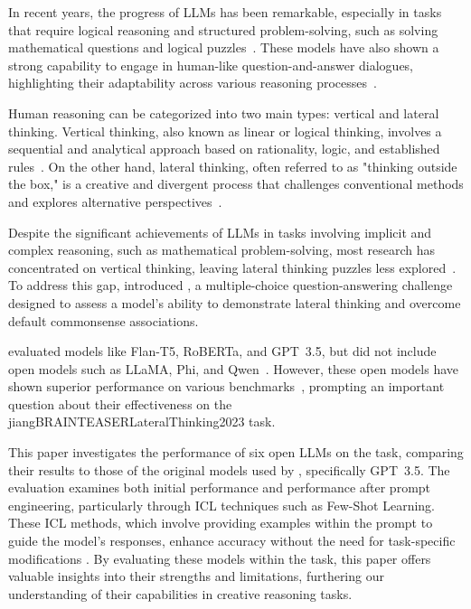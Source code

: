 In recent years, the progress of \acp{LLM} has been remarkable, especially in tasks that require logical reasoning and structured problem-solving, such as solving mathematical questions and logical puzzles~\cite{panLogicLMEmpoweringLarge2023,zebazeTreeProblemsImproving2024,yuFlowReasoningTraining2025}. These models have also shown a strong capability to engage in human-like question-and-answer dialogues, highlighting their adaptability across various reasoning processes~\cite{haoRecentProgressLeveraging2022, panLogicLMEmpoweringLarge2023,zebazeTreeProblemsImproving2024,yuFlowReasoningTraining2025}.

Human reasoning can be categorized into two main types: vertical and lateral thinking. Vertical thinking, also known as linear or logical thinking, involves a sequential and analytical approach based on rationality, logic, and established rules~\cite{jiangBRAINTEASERLateralThinking2023}. On the other hand, lateral thinking, often referred to as "thinking outside the box," is a creative and divergent process that challenges conventional methods and explores alternative perspectives~\cite{jiangBRAINTEASERLateralThinking2023}.

Despite the significant achievements of \acp{LLM} in tasks involving implicit and complex reasoning, such as mathematical problem-solving, most research has concentrated on vertical thinking, leaving lateral thinking puzzles less explored~\cite{jiangBRAINTEASERLateralThinking2023,chenWeakevalStrongEvaluatingEliciting2024,huangLatEvalInteractiveLLMs2024}. To address this gap, \textcite{jiangBRAINTEASERLateralThinking2023} introduced , a multiple-choice question-answering challenge designed to assess a model's ability to demonstrate lateral thinking and overcome default commonsense associations.

\textcite{jiangBRAINTEASERLateralThinking2023} evaluated models like Flan-T5, RoBERTa, and \acs{GPT}~3.5, but did not include open models such as \acs{LLaMA}, \acs{Phi}, and \acs{Qwen}~\cite{jiangBRAINTEASERLateralThinking2023}. However, these open 
models have shown superior performance on various benchmarks~\cite{OpenLLMLeaderboard}, 
prompting an important question about their effectiveness on the \citetitle
{jiangBRAINTEASERLateralThinking2023} task.

This paper investigates the performance of six open \acp{LLM} on the  task, comparing their results to those of the original models used by \textcite{jiangBRAINTEASERLateralThinking2023}, specifically \acs{GPT}~3.5. The evaluation examines both initial performance and performance after prompt engineering, particularly through \ac{ICL} techniques such as Few-Shot Learning. These \ac{ICL} methods, which involve providing examples within the prompt to guide the model’s responses, enhance accuracy without the need for task-specific modifications \cite{yinDeeperInsightsUpdates2024,brownLanguageModelsAre2020}. By evaluating these models within the  task, this paper offers valuable insights into their strengths and limitations, furthering our understanding of their capabilities in creative reasoning tasks.